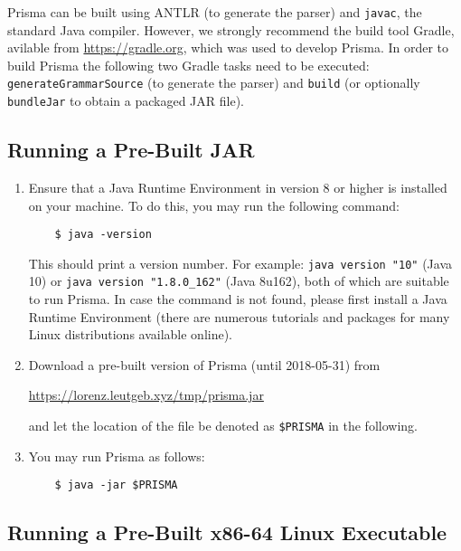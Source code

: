 \documentclass{llncs}
\begin{document}
Prisma can be built using ANTLR (to generate the parser) and \texttt{javac}, the standard Java compiler. However, we strongly recommend the build tool Gradle, avilable from \url{https://gradle.org}, which was used to develop Prisma. In order to build Prisma the following two Gradle tasks need to be executed: \texttt{generateGrammarSource} (to generate the parser) and \texttt{build} (or optionally \texttt{bundleJar} to obtain a packaged JAR file).

\subsection{Running a Pre-Built JAR}
\label{sec:runjar}

\begin{enumerate}
	\item{Ensure that a Java Runtime Environment in version 8 or higher is installed on your machine. To do this, you may run the following command:
	\begin{verbatim}
	$ java -version
	\end{verbatim}
	This should print a version number. For example: \texttt{java~version~"10"} (Java 10) or \texttt{java~version~"1.8.0\_162"} (Java 8u162), both of which are suitable to run Prisma. In case the command is not found, please first install a Java Runtime Environment (there are numerous tutorials and packages for many Linux distributions available online).
	}
	\item{Download a pre-built version of Prisma (until 2018-05-31) from
	\begin{center}
	\url{https://lorenz.leutgeb.xyz/tmp/prisma.jar}
	\end{center} and let the location of the file be denoted as \texttt{\$PRISMA} in the following.}
	\item{You may run Prisma as follows:
	\begin{verbatim}
	$ java -jar $PRISMA
	\end{verbatim}
	}
\end{enumerate}

\subsection{Running a Pre-Built x86-64 Linux Executable}
\label{sec:runelf}
\end{document}
